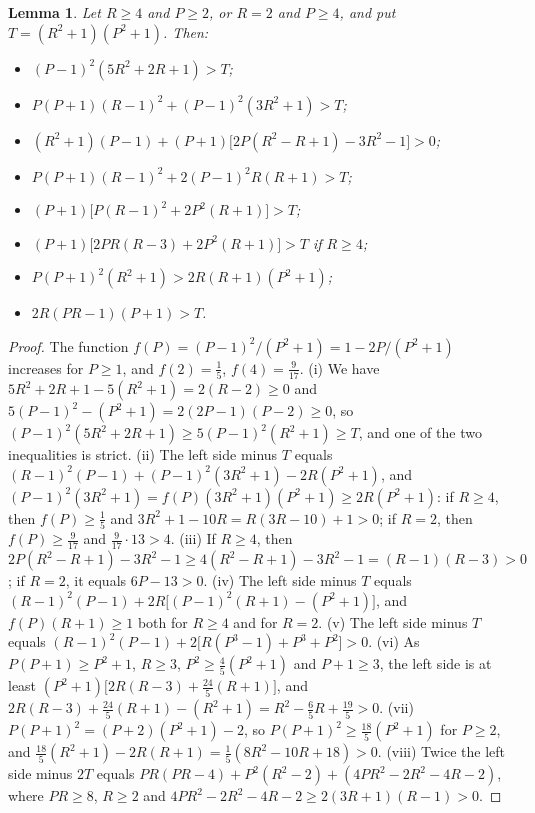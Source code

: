 \documentclass[11pt]{article}
\newtheorem{lemma}[theorem]{Lemma}
\theoremstyle{remark}
\begin{document}
\begin{lemma}\label{lem:ineq}
Let $R\ge4$ and $P\ge2$, or $R=2$ and $P\ge4$, and put
$T=(R^2+1)(P^2+1)$. Then:
\begin{itemize}
\item[(i)] $(P-1)^2(5R^2+2R+1)>T$;
\item[(ii)] $P(P+1)(R-1)^2+(P-1)^2(3R^2+1)>T$;
\item[(iii)] $(R^2+1)(P-1)+(P+1)\bigl[2P(R^2-R+1)-3R^2-1\bigr]>0$;
\item[(iv)] $P(P+1)(R-1)^2+2(P-1)^2R(R+1)>T$;
\item[(v)] $(P+1)\bigl[P(R-1)^2+2P^2(R+1)\bigr]>T$;
\item[(vi)] $(P+1)\bigl[2PR(R-3)+2P^2(R+1)\bigr]>T$ if $R\ge4$;
\item[(vii)] $P(P+1)^2(R^2+1)>2R(R+1)(P^2+1)$;
\item[(viii)] $2R(PR-1)(P+1)>T$.
\end{itemize}
\end{lemma}
\begin{proof}
The function $f(P)=(P-1)^2/(P^2+1)=1-2P/(P^2+1)$ increases for $P\ge1$, and
$f(2)=\frac15$, $f(4)=\frac9{17}$.
(i) We have $5R^2+2R+1-5(R^2+1)=2(R-2)\ge0$ and
$5(P-1)^2-(P^2+1)=2(2P-1)(P-2)\ge0$, so
$(P-1)^2(5R^2+2R+1)\ge5(P-1)^2(R^2+1)\ge T$, and one of the two inequalities
is strict.
(ii) The left side minus $T$ equals
$(R-1)^2(P-1)+(P-1)^2(3R^2+1)-2R(P^2+1)$, and
$(P-1)^2(3R^2+1)=f(P)(3R^2+1)(P^2+1)\ge2R(P^2+1)$: if $R\ge4$, then
$f(P)\ge\frac15$ and $3R^2+1-10R=R(3R-10)+1>0$; if $R=2$, then
$f(P)\ge\frac9{17}$ and $\frac9{17}\cdot13>4$.
(iii) If $R\ge4$, then
$2P(R^2-R+1)-3R^2-1\ge4(R^2-R+1)-3R^2-1=(R-1)(R-3)>0$; if $R=2$, it equals
$6P-13>0$.
(iv) The left side minus $T$ equals
$(R-1)^2(P-1)+2R\bigl[(P-1)^2(R+1)-(P^2+1)\bigr]$, and $f(P)(R+1)\ge1$ both
for $R\ge4$ and for $R=2$.
(v) The left side minus $T$ equals
$(R-1)^2(P-1)+2\bigl[R(P^3-1)+P^3+P^2\bigr]>0$.
(vi) As $P(P+1)\ge P^2+1$, $R\ge3$, $P^2\ge\frac45(P^2+1)$ and $P+1\ge3$, the
left side is at least $(P^2+1)\bigl[2R(R-3)+\frac{24}5(R+1)\bigr]$, and
$2R(R-3)+\frac{24}5(R+1)-(R^2+1)=R^2-\frac65R+\frac{19}5>0$.
(vii) $P(P+1)^2=(P+2)(P^2+1)-2$, so $P(P+1)^2\ge\frac{18}5(P^2+1)$ for $P\ge2$,
and $\frac{18}5(R^2+1)-2R(R+1)=\frac15(8R^2-10R+18)>0$.
(viii) Twice the left side minus $2T$ equals
$PR(PR-4)+P^2(R^2-2)+(4PR^2-2R^2-4R-2)$, where $PR\ge8$, $R\ge2$ and
$4PR^2-2R^2-4R-2\ge2(3R+1)(R-1)>0$.
\end{proof}
\end{document}
